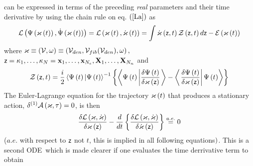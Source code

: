 can be expressed in terms of the preceding {\em real }parameters and their
time derivative by using the chain rule on eq. $\left( \ref{La}\right) $ as 
\begin{equation}
{\cal L}\left( \Psi \left( {\cal \varkappa }\left( t\right) \right) ,\dot{%
\Psi}\left( {\cal \varkappa }\left( t\right) \right) \right) ={\cal L}\left( 
{\cal \varkappa }\left( t\right) ,{\cal \dot{\varkappa}}\left( t\right)
\right) =\int {\cal \dot{\varkappa}}\left( {\sf z},t\right) {\cal Z}\left( 
{\sf z},t\right) d{\sf z}-{\cal E}\left( {\cal \varkappa }\left( t\right)
\right)   \label{ladef}
\end{equation}%
where ${\cal \varkappa }\equiv \left( {\cal V},\omega \right) \equiv \left( 
{\cal V}_{den},{\cal V}_{fib}({\cal V}_{den}),\omega \right) ,$ ${\sf z}%
=\kappa _{1},\ldots ,\kappa _{N}={\bf x}_{1},\ldots ,{\bf x}_{N_{e}},{\bf X}%
_{1},\ldots ,{\bf X}_{N_{n}}$ and 
\begin{equation}
{\cal Z}\left( {\sf z},t\right) =\frac{i}{2}\left\langle \Psi \left(
t\right) |\Psi \left( t\right) \right\rangle ^{-1}\left\{ \left\langle \Psi
\left( t\right) \left| \frac{\delta \Psi \left( t\right) }{\delta {\cal %
\varkappa }\left( {\sf z}\right) }\right. \right\rangle -\left\langle \left. 
\frac{\delta \Psi \left( t\right) }{\delta {\cal \varkappa }\left( {\sf z}%
\right) }\right| \Psi \left( t\right) \right\rangle \right\} 
\end{equation}%
The Euler-Lagrange equation for the trajectory ${\cal \varkappa }\left(
t\right) $ that produces a stationary action, $\delta ^{\left( 1\right) }%
{\cal A}\left( {\cal \varkappa },\tau \right) =0$, is then 
\begin{equation}
\frac{\delta {\cal L}\left( {\cal \varkappa },{\cal \dot{\varkappa}}\right) 
}{\delta {\cal \varkappa }\left( {\sf z}\right) }-\frac{d}{dt}\left\{ \frac{%
\delta {\cal L}\left( {\cal \varkappa },{\cal \dot{\varkappa}}\right) }{%
\delta {\cal \dot{\varkappa}}\left( {\sf z}\right) }\right\} \stackrel{a.e.}{%
=}0  \label{EL}
\end{equation}%
($a.e.$ with respect to ${\sf z}$ not $t$, this is implied in all following
equations${\sf )}$. This is a second ODE\ which is made clearer if one
evaluates the time derrivative term to obtain 
